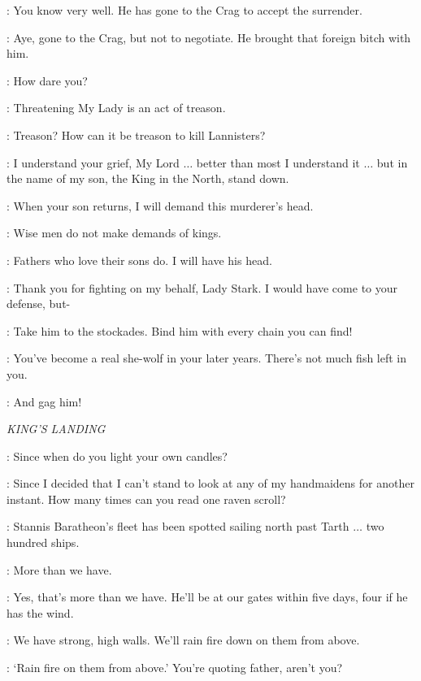 \CATELYN: You know very well. He has gone to the Crag to accept the surrender.

\KARSTARK: Aye, gone to the Crag, but not to negotiate. He brought that foreign bitch with him.

\CATELYN: How dare you?

\BRIENNE: Threatening My Lady is an act of treason.

\KARSTARK: Treason? How can it be treason to kill Lannisters?

\CATELYN: I understand your grief, My Lord $\ldots$ better than most I understand it $\ldots$ but in the name of my son, the King in the North, stand down.

\KARSTARK: When your son returns, I will demand this murderer's head.

\CATELYN: Wise men do not make demands of kings.

\KARSTARK: Fathers who love their sons do. I will have his head.

\JAIME: Thank you for fighting on my behalf, Lady Stark. I would have come to your defense, but-


\CATELYN: Take him to the stockades. Bind him with every chain you can find!

\JAIME: You've become a real she-wolf in your later years. There's not much fish left in you.

\CATELYN: And gag him!


\scene

\textit{KING'S LANDING}


\TYRION: Since when do you light your own candles?

\CERSEI: Since I decided that I can't stand to look at any of my handmaidens for another instant. How many times can you read one raven scroll?

\TYRION: Stannis Baratheon's fleet has been spotted sailing north past Tarth $\ldots$ two hundred ships.

\CERSEI: More than we have.

\TYRION: Yes, that's more than we have. He'll be at our gates within five days, four if he has the wind.

\CERSEI: We have strong, high walls. We'll rain fire down on them from above.

\TYRION: `Rain fire on them from above.' You're quoting father, aren't you?

